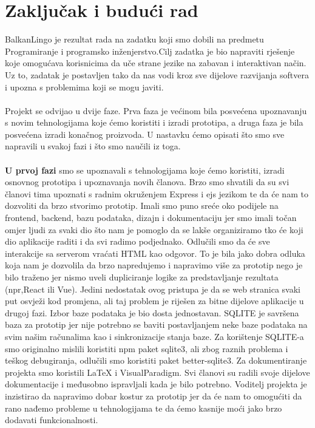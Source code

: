 \chapter{Zaključak i budući rad}
		
		BalkanLingo je rezultat rada na zadatku koji smo dobili na predmetu Programiranje i programsko inženjerstvo.Cilj zadatka je bio napraviti rješenje koje omogućava korisnicima da uče strane jezike na zabavan i interaktivan način. Uz to, zadatak je postavljen tako da nas vodi kroz sve dijelove razvijanja softvera i upozna s problemima koji se mogu javiti.
		\\
		\\
		Projekt se odvijao u dvije faze. Prva faza je većinom bila posvećena upoznavanju s novim tehnologijama koje ćemo koristiti i izradi prototipa, a druga faza je bila posvećena izradi konačnog proizvoda.
		U nastavku ćemo opisati što smo sve napravili u svakoj fazi i što smo naučili iz toga.
	   	\\
		\\
		\textbf{U prvoj fazi} smo se upoznavali s tehnologijama koje ćemo koristiti, izradi osnovnog prototipa i upoznavanja novih članova. Brzo smo shvatili da su svi članovi tima upoznati s radnim okruženjem Express i ejs jezikom te da će nam to dozvoliti  da brzo stvorimo prototip. Imali smo puno sreće oko podijele na frontend, backend, bazu podataka, dizajn i dokumentaciju jer smo imali točan omjer ljudi za svaki dio što nam je pomoglo da se lakše organiziramo tko će koji dio aplikacije raditi i da svi radimo podjednako. Odlučili smo da će sve interakcije sa serverom vraćati HTML kao odgovor. To je bila jako dobra odluka koja nam je dozvolila da brzo napredujemo i napravimo više za prototip nego je bilo traženo jer nismo uveli dupliciranje logike za predstavljanje rezultata (npr,React ili Vue). Jedini nedostatak ovog pristupa je da se web stranica svaki put osvježi kod promjena, ali taj problem je riješen za bitne dijelove aplikacije u drugoj fazi. Izbor baze podataka je bio dosta jednostavan. SQLITE je savršena baza za prototip jer nije potrebno se baviti postavljanjem neke baze podataka na svim našim računalima kao i sinkronizacije stanja baze. Za korištenje SQLITE-a smo originalno mislili koristiti npm paket sqlite3, ali zbog raznih problema i teškog debugiranja, odlučili smo koristiti paket better-sqlite3. Za dokumentiranje projekta smo koristili LaTeX i VisualParadigm. Svi članovi su radili svoje dijelove dokumentacije i međusobno ispravljali kada je bilo potrebno. Voditelj projekta je inzistirao da napravimo dobar kostur za prototip jer da će nam to omogućiti da rano nađemo probleme u tehnologijama te da ćemo kasnije moći jako brzo dodavati funkcionalnosti. 
		\\

